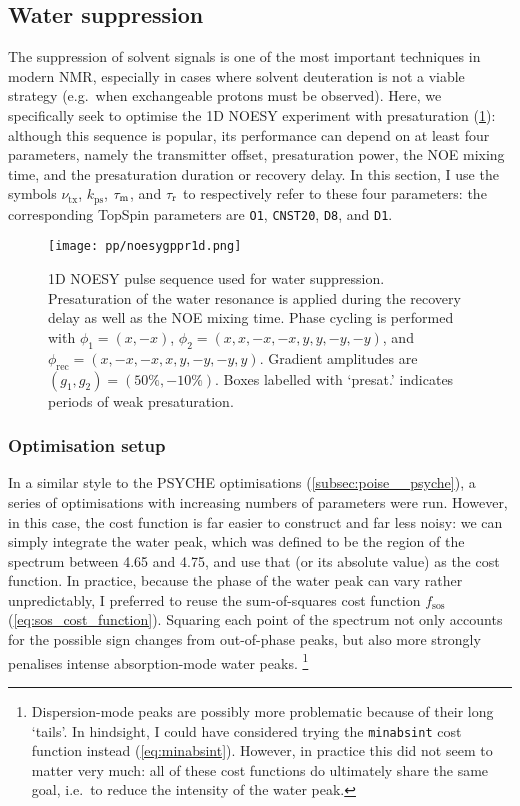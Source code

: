 \subsection{Water suppression}
\label{subsec:poise__solvsupp}

The suppression of solvent signals is one of the most important techniques in modern NMR, especially in cases where solvent deuteration is not a viable strategy (e.g.\ when exchangeable protons must be observed).\autocite{Hore1983JMR,Zheng2010PNMRS,Giraudeau2015M}
Here, we specifically seek to optimise the 1D NOESY experiment with presaturation\autocite{Mckay2011CMR} (\cref{fig:poise_solvsupp_pulseq}): although this sequence is popular, its performance can depend on at least four parameters, namely the transmitter offset, presaturation power, the NOE mixing time, and the presaturation duration or recovery delay.
In this section, I use the symbols $\nu_\text{tx}$, $k_\text{ps}$, $\tau_\mathrm{m}$, and $\tau_\mathrm{r}$ to respectively refer to these four parameters: the corresponding TopSpin parameters are \texttt{O1}, \texttt{CNST20}, \texttt{D8}, and \texttt{D1}.

\begin{figure}[htb]
    \centering
    \texttt{[image: pp/noesygppr1d.png]}%
    \caption[1D NOESY pulse sequence for water suppression]{
        1D NOESY pulse sequence used for water suppression.
        Presaturation of the water resonance is applied during the recovery delay as well as the NOE mixing time.
        Phase cycling is performed with $\phi_1 = (x, -x)$, $\phi_2 = (x, x, -x, -x, y, y, -y, -y)$, and $\phi_\text{rec} = (x, -x, -x, x, y, -y, -y, y)$.
        Gradient amplitudes are $(g_1, g_2) = (50\%, -10\%)$.
        Boxes labelled with `presat.' indicates periods of weak presaturation.
    }
    \label{fig:poise_solvsupp_pulseq}
\end{figure}


\subsubsection{Optimisation setup}

In a similar style to the PSYCHE optimisations (\cref{subsec:poise__psyche}), a series of optimisations with increasing numbers of parameters were run.
However, in this case, the cost function is far easier to construct and far less noisy: we can simply integrate the water peak, which was defined to be the region of the spectrum between 4.65 and \qty{4.75}{\ppm}, and use that (or its absolute value) as the cost function.
In practice, because the phase of the water peak can vary rather unpredictably, I preferred to reuse the sum-of-squares cost function $f_\text{sos}$ (\cref{eq:sos_cost_function}).
Squaring each point of the spectrum not only accounts for the possible sign changes from out-of-phase peaks, but also more strongly penalises intense absorption-mode water peaks.%
\footnote{Dispersion-mode peaks are possibly more problematic because of their long `tails'. In hindsight, I could have considered trying the \texttt{minabsint} cost function instead (\cref{eq:minabsint}). However, in practice this did not seem to matter very much: all of these cost functions do ultimately share the same goal, i.e.\ to reduce the intensity of the water peak.}

